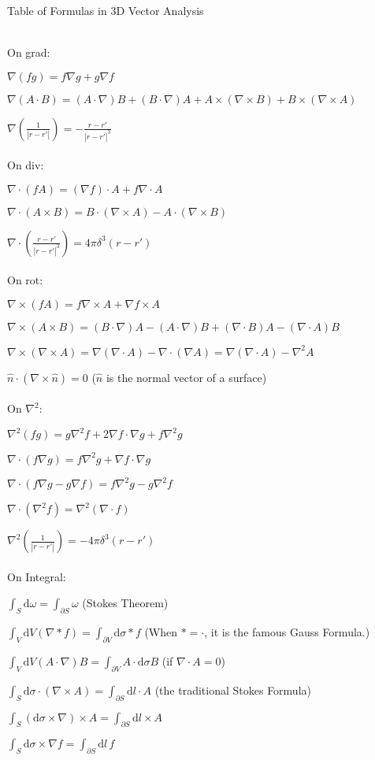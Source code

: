 \noindent \begin{large}Table of Formulas in 3D Vector Analysis\end{large}
\vspace{3ex}
\\
On grad:
 
$\nabla(fg)=f\nabla g+g\nabla f$

$\nabla(A\cdot B)=(A\cdot \nabla)B+(B\cdot \nabla)A+A\times (\nabla \times B)+B\times (\nabla \times A)$

$\displaystyle{\nabla \left(\frac{1}{|r-r'|} \right) = -\frac{r-r'}{|r-r'|^3}}$\\
\\
On div:
 
$\nabla\cdot(fA) = (\nabla f) \cdot A + f\nabla\cdot A $

$\nabla\cdot(A \times B) = B\cdot (\nabla \times A)-A\cdot (\nabla \times B)$

$\displaystyle{\nabla\cdot \left(\frac{r-r'}{|r-r'|^3} \right) = 4\pi \delta^3(r-r')}$\\
\\
On rot:

$\nabla\times(fA)=f\nabla \times A + \nabla f \times A $

$\nabla\times(A\times B)=(B\cdot \nabla)A-(A\cdot \nabla)B+(\nabla\cdot B)A-(\nabla\cdot A)B$

$\nabla\times(\nabla\times A)=\nabla(\nabla\cdot A)-\nabla \cdot (\nabla A)=\nabla(\nabla\cdot A)-\nabla^2 A$

$\hat{n}\cdot (\nabla\times \hat{n})=0$  ($\hat{n}$ is the normal vector of a surface)\\
\\
On $\nabla^2$:

$\nabla^2(fg)=g\nabla^2 f+2\nabla f\cdot \nabla g+f\nabla^2 g$

$\nabla \cdot (f\nabla g)=f\nabla^2 g+\nabla f\cdot \nabla g$

$\nabla \cdot (f\nabla g-g\nabla f)=f\nabla^2 g-g\nabla^2 f$

$\nabla \cdot (\nabla^2 f)=\nabla^2(\nabla \cdot f)$

$\displaystyle{\nabla^2\left(\frac{1}{|r-r'|} \right) =-4\pi \delta^3(r-r')}$\\
\\
On Integral:

$\displaystyle{\int_S \mathrm{d}\omega=\int_{\partial S}\omega}$  (Stokes Theorem)

$\displaystyle{\int_V \mathrm{d}V(\nabla*f)=\int_{\partial V}\mathrm{d}\sigma *f }$  (When $*=\cdot$, it is the famous Gauss Formula.)

$\displaystyle{\int_V \mathrm{d}V(A\cdot \nabla)B =\int_{\partial V}A\cdot\mathrm{d}\sigma}B$   (if $\nabla \cdot A=0$)

$\displaystyle{\int_S \mathrm{d}\sigma \cdot (\nabla \times A)=\int_{\partial S}\mathrm{d}l\cdot A }$  (the traditional Stokes Formula)

$\displaystyle{\int_S (\mathrm{d}\sigma \times \nabla)\times A=\int_{\partial S}\mathrm{d}l \times A}$

$\displaystyle{\int_S \mathrm{d}\sigma \times \nabla f=\int_{\partial S}\mathrm{d}l\, f }$\\
